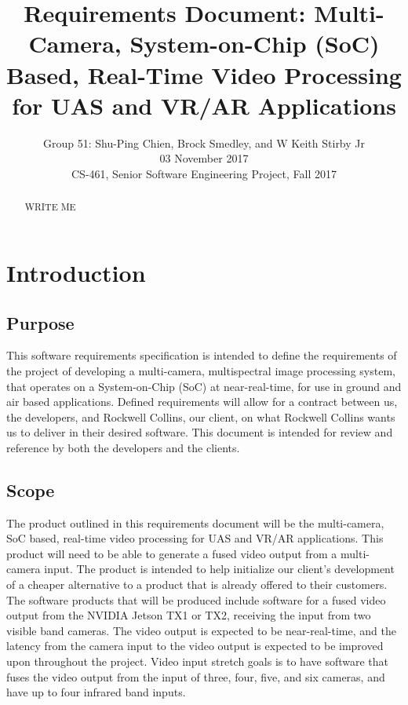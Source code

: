 \documentclass[letterpaper,10pt,serif,draftclsnofoot,onecolumn,compsoc,titlepage]{IEEEtran}
\title{Requirements Document: Multi-Camera, System-on-Chip (SoC) Based, Real-Time Video Processing for UAS and VR/AR Applications}
\author{Group 51: Shu-Ping Chien, Brock Smedley, and W Keith Stirby Jr \\ 03 November 2017 \\ CS-461, Senior Software Engineering Project, Fall 2017}
\begin{document}
\begin{titlepage}
\maketitle
\begin{abstract}

WRITE ME \\

\end{abstract}
\end{titlepage}
\newpage

\tableofcontents
\newpage

\section{Introduction}

\subsection{Purpose}

This software requirements specification is intended to define the requirements of the 
project of developing a multi-camera, multispectral image processing system, that 
operates on a System-on-Chip (SoC) at near-real-time, for use in ground and air based 
applications. Defined requirements will allow for a contract between us, the 
developers, and Rockwell Collins, our client, on what Rockwell Collins wants us to 
deliver in their desired software. This document is intended for review and reference 
by both the developers and the clients.\\

\subsection{Scope}

The product outlined in this requirements document will be the multi-camera, SoC based,
 real-time video processing for UAS and VR/AR applications. This product will need to 
 be able to generate a fused video output from a multi-camera input. The product is 
 intended to help initialize our client's development of a cheaper alternative to a 
 product that is already offered to their customers.\\

The software products that will be produced include software for a fused video output 
from the NVIDIA Jetson TX1 or TX2, receiving the input from two visible band cameras. 
The video output is expected to be near-real-time, and the latency from the camera 
input to the video output is expected to be improved upon throughout the project. Video 
input stretch goals is to have software that fuses the video output from the input of 
three, four, five, and six cameras, and have up to four infrared band inputs.\\ 
\end{document}
